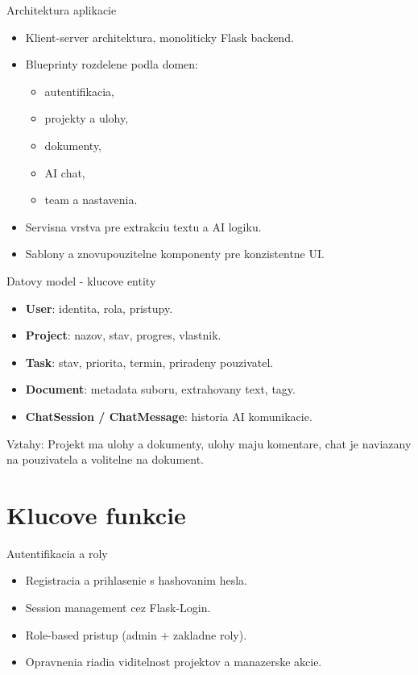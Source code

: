 \documentclass[aspectratio=169]{beamer}
\begin{document}
\begin{frame}{Architektura aplikacie}
  \begin{itemize}
    \item Klient-server architektura, monoliticky Flask backend.
    \item Blueprinty rozdelene podla domen:
      \begin{itemize}
        \item autentifikacia,
        \item projekty a ulohy,
        \item dokumenty,
        \item AI chat,
        \item team a nastavenia.
      \end{itemize}
    \item Servisna vrstva pre extrakciu textu a AI logiku.
    \item Sablony a znovupouzitelne komponenty pre konzistentne UI.
  \end{itemize}
\end{frame}

\begin{frame}{Datovy model - klucove entity}
  \begin{itemize}
    \item \textbf{User}: identita, rola, pristupy.
    \item \textbf{Project}: nazov, stav, progres, vlastnik.
    \item \textbf{Task}: stav, priorita, termin, priradeny pouzivatel.
    \item \textbf{Document}: metadata suboru, extrahovany text, tagy.
    \item \textbf{ChatSession / ChatMessage}: historia AI komunikacie.
  \end{itemize}
  \vspace{0.3cm}
  Vztahy: Projekt ma ulohy a dokumenty, ulohy maju komentare, chat je naviazany na pouzivatela a volitelne na dokument.
\end{frame}

\section{Klucove funkcie}
\begin{frame}{Autentifikacia a roly}
  \begin{itemize}
    \item Registracia a prihlasenie s hashovanim hesla.
    \item Session management cez Flask-Login.
    \item Role-based pristup (admin + zakladne roly).
    \item Opravnenia riadia viditelnost projektov a manazerske akcie.
  \end{itemize}
\end{frame}
\end{document}
